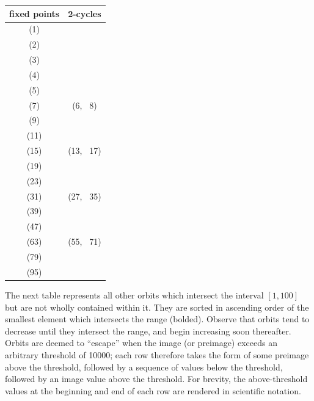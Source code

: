\documentclass[12pt,reqno]{article}
\begin{document}
\begin{center} \begin{tabular}{|c|c|}
  \hline
  fixed points & 2-cycles \\
  \hline
  (1) & \\
  (2) & \\
  (3) & \\
  (4) & \\
  (5) & \\
  (7) & (6, \, 8) \\
  (9) & \\
  (11) & \\
  (15) & (13, \, 17) \\
  (19) & \\
  (23) & \\
  (31) & (27, \, 35) \\
  (39) & \\
  (47) & \\
  (63) & (55, \, 71) \\
  (79) & \\
  (95) & \\
  \hline
\end{tabular} \end{center}

The next table represents all other orbits which intersect the interval $ [1, 100] $ but are not wholly contained within it. They are sorted in ascending order of the smallest element which intersects the range (bolded). Observe that orbits tend to decrease until they intersect the range, and begin increasing soon thereafter. Orbits are deemed to ``escape'' when the image (or preimage) exceeds an arbitrary threshold of 10000; each row therefore takes the form of some preimage above the threshold, followed by a sequence of values below the threshold, followed by an image value above the threshold. For brevity, the above-threshold values at the beginning and end of each row are rendered in scientific notation.
\end{document}
